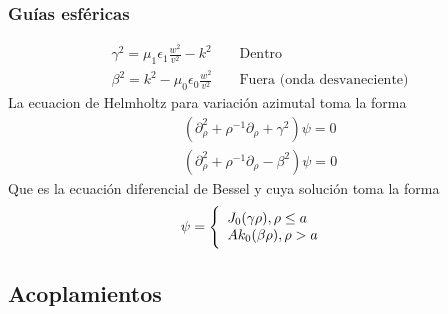 \subsubsection{Guías esféricas}
\begin{subequations}
	\begin{align}
	\gamma^2 =  \mu_{1} \epsilon_{1} \frac{w^2}{v^2} - k^2   && \text{  Dentro}\\
	\beta^2 = k^2 - \mu_{0} \epsilon_{0} \frac{w^2}{v^2}   && \text{ Fuera (onda desvaneciente)}
	\end{align}
\end{subequations}
La ecuacion de Helmholtz para variación azimutal toma la forma
\begin{subequations}
	\begin{align}
	(\partial_{\rho}^2+\rho^{-1} \partial_{\rho}+\gamma^2) \psi = 0\\
	(\partial_{\rho}^2+\rho^{-1} \partial_{\rho}-\beta^2) \psi = 0
	\end{align}
\end{subequations}
Que es la ecuación diferencial de Bessel y cuya solución toma la forma
 \label{Soluciones metalico bessel}
\begin{eqnarray}
\psi   & =  \Bigg\{ 
\begin{array}{ll}
J_{0}(\gamma \rho), \rho \leq a \hfill \\ 
 A k_{0} (\beta \rho), \rho > a 
 \end{array}
\end{eqnarray}


\subsection{Acoplamientos}